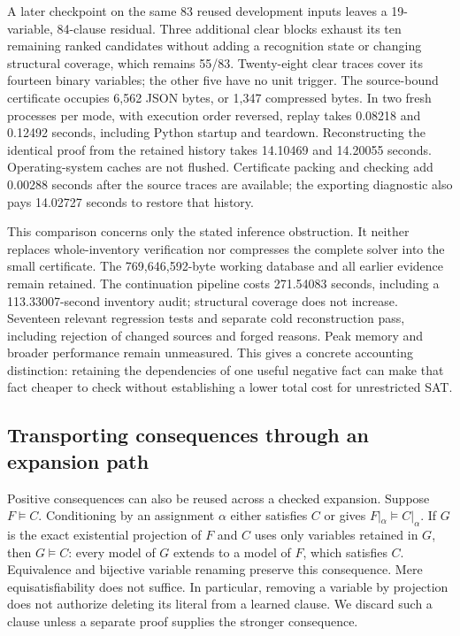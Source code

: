 \documentclass[11pt,a4paper]{article}
\numberwithin{equation}{section}
\theoremstyle{plain}
\theoremstyle{definition}
\theoremstyle{remark}
\begin{document}
A later checkpoint on the same 83 reused development inputs leaves a 19-variable, 84-clause residual. Three additional clear blocks exhaust its ten remaining ranked candidates without adding a recognition state or changing structural coverage, which remains 55/83. Twenty-eight clear traces cover its fourteen binary variables; the other five have no unit trigger. The source-bound certificate occupies 6,562 JSON bytes, or 1,347 compressed bytes. In two fresh processes per mode, with execution order reversed, replay takes 0.08218 and 0.12492 seconds, including Python startup and teardown. Reconstructing the identical proof from the retained history takes 14.10469 and 14.20055 seconds. Operating-system caches are not flushed. Certificate packing and checking add 0.00288 seconds after the source traces are available; the exporting diagnostic also pays 14.02727 seconds to restore that history.

This comparison concerns only the stated inference obstruction. It neither replaces whole-inventory verification nor compresses the complete solver into the small certificate. The 769,646,592-byte working database and all earlier evidence remain retained. The continuation pipeline costs 271.54083 seconds, including a 113.33007-second inventory audit; structural coverage does not increase. Seventeen relevant regression tests and separate cold reconstruction pass, including rejection of changed sources and forged reasons. Peak memory and broader performance remain unmeasured. This gives a concrete accounting distinction: retaining the dependencies of one useful negative fact can make that fact cheaper to check without establishing a lower total cost for unrestricted SAT.

\subsection{Transporting consequences through an expansion path}
\label{sec:parent-lemma-transport}

Positive consequences can also be reused across a checked expansion. Suppose $F\models C$. Conditioning by an assignment $\alpha$ either satisfies $C$ or gives $F|_\alpha\models C|_\alpha$. If $G$ is the exact existential projection of $F$ and $C$ uses only variables retained in $G$, then $G\models C$: every model of $G$ extends to a model of $F$, which satisfies $C$. Equivalence and bijective variable renaming preserve this consequence. Mere equisatisfiability does not suffice. In particular, removing a variable by projection does not authorize deleting its literal from a learned clause. We discard such a clause unless a separate proof supplies the stronger consequence.
\end{document}
